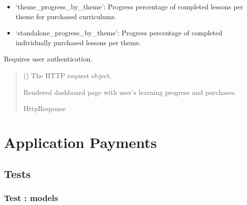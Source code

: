 \documentclass[letterpaper,10pt,english]{sphinxmanual}
\begin{document}
\begin{fulllineitems}
\begin{itemize}
\item {} 
\sphinxAtStartPar
‘theme\_progress\_by\_theme’: Progress percentage of completed lessons per theme for purchased curriculums.

\item {} 
\sphinxAtStartPar
‘standalone\_progress\_by\_theme’: Progress percentage of completed individually purchased lessons per theme.

\end{itemize}

\sphinxAtStartPar
Requires user authentication.
\begin{quote}\begin{description}
\sphinxAtStartPar
{} () \textendash{} The HTTP request object.

\sphinxAtStartPar
Rendered dashboard page with user’s learning progress and purchases.

\sphinxAtStartPar
HttpResponse

\end{description}\end{quote}

\end{fulllineitems}


\sphinxstepscope


\chapter{Application Payments}
\label{\detokenize{payments:application-payments}}\label{\detokenize{payments::doc}}

\section{Tests}
\label{\detokenize{payments:tests}}
\sphinxstepscope


\subsection{Test : models}
\label{\detokenize{payments.tests:module-payments.tests.test_models}}\label{\detokenize{payments.tests:test-models}}\label{\detokenize{payments.tests::doc}}
\end{document}
